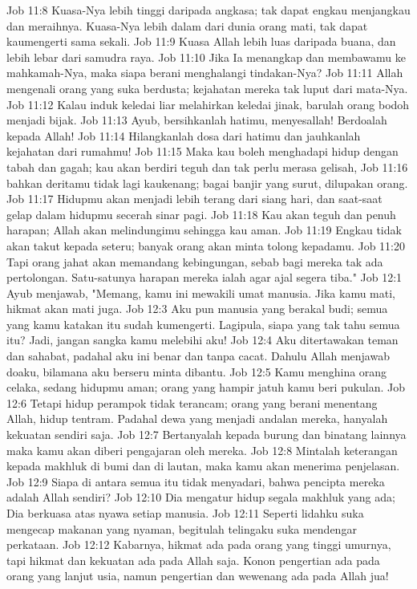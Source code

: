 Job 11:8  Kuasa-Nya lebih tinggi daripada angkasa; tak dapat engkau menjangkau dan meraihnya. Kuasa-Nya lebih dalam dari dunia orang mati, tak dapat kaumengerti sama sekali.
Job 11:9  Kuasa Allah lebih luas daripada buana, dan lebih lebar dari samudra raya.
Job 11:10  Jika Ia menangkap dan membawamu ke mahkamah-Nya, maka siapa berani menghalangi tindakan-Nya?
Job 11:11  Allah mengenali orang yang suka berdusta; kejahatan mereka tak luput dari mata-Nya.
Job 11:12  Kalau induk keledai liar melahirkan keledai jinak, barulah orang bodoh menjadi bijak.
Job 11:13  Ayub, bersihkanlah hatimu, menyesallah! Berdoalah kepada Allah!
Job 11:14  Hilangkanlah dosa dari hatimu dan jauhkanlah kejahatan dari rumahmu!
Job 11:15  Maka kau boleh menghadapi hidup dengan tabah dan gagah; kau akan berdiri teguh dan tak perlu merasa gelisah,
Job 11:16  bahkan deritamu tidak lagi kaukenang; bagai banjir yang surut, dilupakan orang.
Job 11:17  Hidupmu akan menjadi lebih terang dari siang hari, dan saat-saat gelap dalam hidupmu secerah sinar pagi.
Job 11:18  Kau akan teguh dan penuh harapan; Allah akan melindungimu sehingga kau aman.
Job 11:19  Engkau tidak akan takut kepada seteru; banyak orang akan minta tolong kepadamu.
Job 11:20  Tapi orang jahat akan memandang kebingungan, sebab bagi mereka tak ada pertolongan. Satu-satunya harapan mereka ialah agar ajal segera tiba."
Job 12:1  Ayub menjawab, "Memang, kamu ini mewakili umat manusia. Jika kamu mati, hikmat akan mati juga.
Job 12:3  Aku pun manusia yang berakal budi; semua yang kamu katakan itu sudah kumengerti. Lagipula, siapa yang tak tahu semua itu? Jadi, jangan sangka kamu melebihi aku!
Job 12:4  Aku ditertawakan teman dan sahabat, padahal aku ini benar dan tanpa cacat. Dahulu Allah menjawab doaku, bilamana aku berseru minta dibantu.
Job 12:5  Kamu menghina orang celaka, sedang hidupmu aman; orang yang hampir jatuh kamu beri pukulan.
Job 12:6  Tetapi hidup perampok tidak terancam; orang yang berani menentang Allah, hidup tentram. Padahal dewa yang menjadi andalan mereka, hanyalah kekuatan sendiri saja.
Job 12:7  Bertanyalah kepada burung dan binatang lainnya maka kamu akan diberi pengajaran oleh mereka.
Job 12:8  Mintalah keterangan kepada makhluk di bumi dan di lautan, maka kamu akan menerima penjelasan.
Job 12:9  Siapa di antara semua itu tidak menyadari, bahwa pencipta mereka adalah Allah sendiri?
Job 12:10  Dia mengatur hidup segala makhluk yang ada; Dia berkuasa atas nyawa setiap manusia.
Job 12:11  Seperti lidahku suka mengecap makanan yang nyaman, begitulah telingaku suka mendengar perkataan.
Job 12:12  Kabarnya, hikmat ada pada orang yang tinggi umurnya, tapi hikmat dan kekuatan ada pada Allah saja. Konon pengertian ada pada orang yang lanjut usia, namun pengertian dan wewenang ada pada Allah jua!
